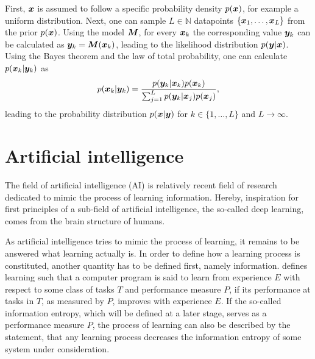 \documentclass[a4paper,12pt]{report}
\def\lk#1{{\color{black}{#1}}}
\begin{document}
First, $\bm{x}$ is assumed to follow a specific probability density $p(\bm{x})$, for example a uniform distribution. Next, one can sample $L\in \mathbb{N}$ datapoints $\{\bm{x}_{1},\dots,\bm{x}_{L}\}$ from the prior $p(\bm{x})$. Using the model $\bm{M}$, for every $\bm{x}_{k}$ the corresponding value $\bm{y}_{k}$ can be calculated as $\bm{y}_{k} = \bm{M}(\bm{x}_{k})$, leading to the likelihood distribution $p(\bm{y}|\bm{x})$. Using the Bayes theorem and the law of total probability, one can calculate $p(\bm{x}_{k}|\bm{y}_{k})$ as \begin{equation}
p(\bm{x}_{k}|\bm{y}_{k}) = \frac{p(\bm{y}_{k}|\bm{x}_{k})p(\bm{x}_{k})}{\sum_{j=1}^{L}p(\bm{y}_{k}|\bm{x}_{j})p(\bm{x}_{j})},
\end{equation} leading to the probability distribution $p(\bm{x}|\bm{y})$ for $k \in \{1,\dots,L\}$ and $L \rightarrow \infty$.

\chapter{Artificial intelligence}
The field of artificial intelligence (AI) is \lk{a} relatively recent field of research dedicated to mimic the process of learning information. Hereby, inspiration for first principles of a sub-field of artificial intelligence, the so-called deep learning, comes from the brain structure of humans. 

As artificial intelligence tries to mimic the process of learning, it remains to be answered what learning actually is. In order to define how a learning process is constituted, another quantity has to be defined first, namely information. \cite[p.2]{Mitchell.1997} defines learning such that a computer program is said to learn from experience $E$ with respect to some class of tasks $T$ and performance measure $P$, if its performance at tasks in $T$, as measured by $P$, improves with experience $E$. If the so-called information entropy, which will be defined at a later stage, serves as a performance measure $P$, the process of learning can also be described by the statement, that any learning process decreases the information entropy of some system under consideration.
\end{document}

